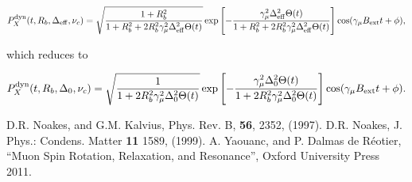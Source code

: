 \documentclass[a4paper,10pt]{article}
\begin{document}
$$ P_{X}^{\rm dyn}(t, R_b, \Delta_{\rm eff}, \nu_c) = \sqrt{\frac{1+R_b^2}{1+R_b^2+2 R_b^2 \gamma_\mu^2 \Delta_{\rm eff}^2 \Theta(t)}}
  \exp\left[-\frac{\gamma_\mu^2 \Delta_{\rm eff}^2 \Theta(t)}{1+R_b^2+2 R_b^2\gamma_\mu^2 \Delta_{\rm eff}^2 \Theta(t)}\right]
  \cos(\gamma_\mu B_{\rm ext} t + \phi),
$$

\noindent which reduces to 

\begin{equation}
 P_{X}^{\rm dyn}(t, R_b, \Delta_0, \nu_c) = \sqrt{\frac{1}{1+2 R_b^2 \gamma_\mu^2 \Delta_0^2 \Theta(t)}}
  \exp\left[-\frac{\gamma_\mu^2 \Delta_0^2 \Theta(t)}{1+2 R_b^2 \gamma_\mu^2 \Delta_0^2 \Theta(t)}\right]
  \cos(\gamma_\mu B_{\rm ext} t + \phi).
\end{equation}

\begin{thebibliography}{99}
  D.R. Noakes, and G.M. Kalvius, Phys. Rev. B, \textbf{56}, 2352, (1997).
  D.R. Noakes, J. Phys.: Condens. Matter \textbf{11} 1589, (1999). 
  A. Yaouanc, and P. Dalmas de R\'{e}otier, ``Muon Spin Rotation, Relaxation, and Resonance'', Oxford University Press 2011. 
\end{thebibliography}
\end{document}
